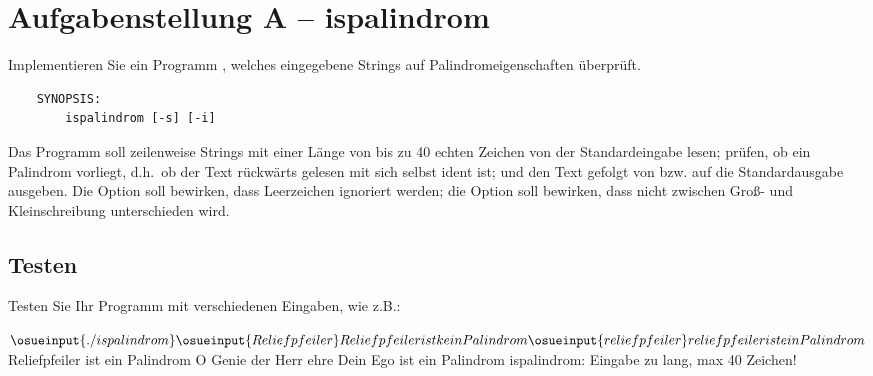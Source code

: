 




\section*{Aufgabenstellung A -- ispalindrom}

Implementieren Sie ein Programm , welches
eingegebene Strings auf Palindromeigenschaften überprüft.

\begin{verbatim}
    SYNOPSIS:
        ispalindrom [-s] [-i]
\end{verbatim}

Das Programm  soll zeilenweise Strings mit einer
Länge von bis zu 40 echten Zeichen von der Standardeingabe lesen;
prüfen, ob ein Palindrom vorliegt, d.h.\ ob der Text rückwärts gelesen
mit sich selbst ident ist; und den Text gefolgt von  bzw.  auf die Standardausgabe
ausgeben. Die Option  soll bewirken, dass Leerzeichen
ignoriert werden; die Option  soll bewirken, dass nicht
zwischen Groß- und Kleinschreibung unterschieden wird.

\subsection*{Testen}

Testen Sie Ihr Programm mit verschiedenen Eingaben, wie z.B.:

\begin{osuefmtcode}
      $ \osueinput{./ispalindrom}
      \osueinput{Reliefpfeiler}
      Reliefpfeiler ist kein Palindrom
      \osueinput{reliefpfeiler}
      reliefpfeiler ist ein Palindrom

      $ 
      Reliefpfeiler ist ein Palindrom
      O Genie der Herr ehre Dein Ego ist ein Palindrom
      ispalindrom: Eingabe zu lang, max 40 Zeichen!
\end{osuefmtcode}

\osueguidelinesone



